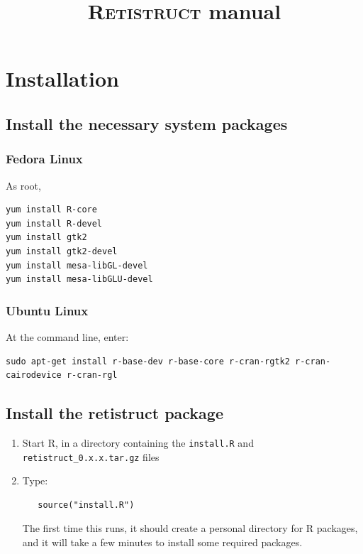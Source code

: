 \documentclass{article}
\title{\textsc{Retistruct} manual}
\begin{document}
\maketitle
\thispagestyle{myheadings}

\section{Installation}
\label{manual:sec:installation}

\subsection{Install the necessary system packages}

\subsubsection{Fedora Linux }

As root,

\begin{verbatim}
yum install R-core
yum install R-devel
yum install gtk2
yum install gtk2-devel
yum install mesa-libGL-devel
yum install mesa-libGLU-devel
\end{verbatim}

\subsubsection{Ubuntu Linux}
At the command line, enter:

\begin{verbatim}
sudo apt-get install r-base-dev r-base-core r-cran-rgtk2 r-cran-cairodevice r-cran-rgl
\end{verbatim}

\subsection{Install the retistruct package}

\begin{enumerate}
\item Start \textsc{R}, in a directory containing the \texttt{install.R} and
   \texttt{retistruct\_0.x.x.tar.gz} files
 \item  Type:
\begin{verbatim}
   source("install.R")
\end{verbatim}
   The first time this runs, it should create a personal directory for
   R packages, and it will take a few minutes to install some required
   packages.
\end{enumerate}
\end{document}
